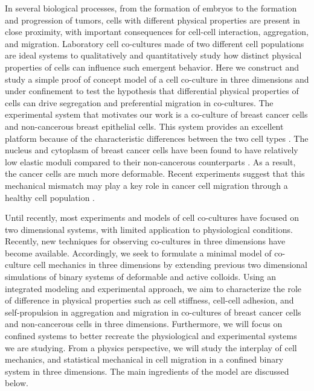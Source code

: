 \documentclass[aps,prb,twocolumn,groupedaddress,nofootinbib,floatfix]{revtex4}
\begin{document}
In several biological processes, from the formation of embryos to the formation and progression of tumors, cells with different physical properties are present in close proximity, with important
consequences for cell-cell interaction, aggregation, and migration. Laboratory cell co-cultures made of two different cell populations are ideal systems to qualitatively and quantitatively 
study how distinct physical properties of cells can influence such emergent behavior. Here we construct and study a simple proof of concept model of a cell co-culture in three dimensions 
and under confinement to test the hypothesis that differential physical properties of cells can drive segregation and preferential migration in co-cultures.   
The experimental system that motivates our work is a co-culture of breast cancer cells and non-cancerous breast epithelial cells. 
This system provides an excellent platform because of the characteristic differences between the two cell types \cite{Lee,Mingming}. 
The nucleus and cytoplasm of breast cancer cells have been found to have relatively low elastic moduli compared to their non-cancerous counterparts \cite{Lee}. 
As a result, the cancer cells are much more deformable. Recent experiments suggest that this mechanical mismatch may play a key role in cancer cell migration through a healthy
cell population \cite{Lee}. 

Until recently, most experiments and models of cell co-cultures have focused on two dimensional systems, with limited application to physiological conditions\cite{Jong}.
Recently, new techniques for observing co-cultures in three dimensions have become available\cite{Alessandri}.  Accordingly, we seek to formulate a minimal
model of co-culture cell mechanics in three dimensions by extending previous two dimensional simulations of binary systems of deformable and active colloids\cite{Butcher}.
Using an integrated modeling and experimental approach, we aim to characterize the role of difference in physical properties such as cell stiffness, cell-cell adhesion,
and self-propulsion in  aggregation and migration in co-cultures of breast cancer cells and non-cancerous cells in three dimensions.
Furthermore, we will focus on confined systems to better recreate the physiological and experimental systems we are studying.
From a physics perspective, we will study the interplay of cell mechanics, and statistical mechanical in cell migration in a confined binary system in three dimensions.
The main ingredients of the model are discussed below.\\
\end{document}
